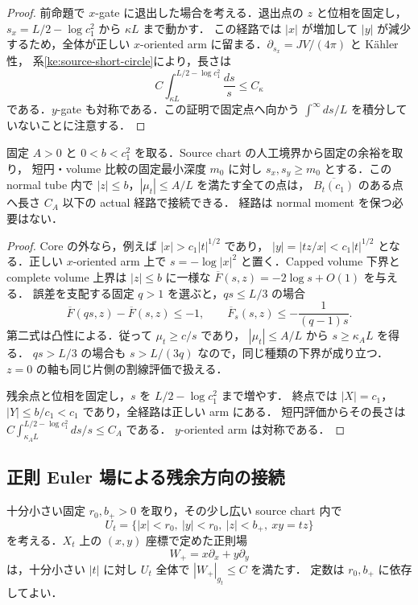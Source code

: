 \begin{proof}
前命題で $x$-gate に退出した場合を考える．退出点の $z$ と位相を固定し，
$s_x=L/2-\log c_1^2$ から $\kappa L$ まで動かす．
この経路では $|x|$ が増加して $|y|$ が減少するため，全体が正しい
$x$-oriented arm に留まる．$\partial_{s_x}=JV/(4\pi)$ と K\"ahler 性，
系\ref{ke:source-short-circle}により，長さは
\[
 C\int_{\kappa L}^{L/2-\log c_1^2}\frac{ds}{s}
 \le C_\kappa
\]
である．$y$-gate も対称である．この証明で固定点へ向かう
$\int^\infty ds/L$ を積分していないことに注意する．
\end{proof}

\begin{proposition}
\label{ke:source-central-band-reduction}
固定 $A>0$ と $0<b<c_1^2$ を取る．Source chart の人工境界から固定の余裕を取り，
短円・volume 比較の固定最小深度 $m_0$ に対し $s_x,s_y\ge m_0$ とする．この normal tube 内で
$|z|\le b$，$|\mu_t|\le A/L$ を満たす全ての点は，
$\overline{B_t(c_1)}$ のある点へ長さ $C_A$ 以下の actual 経路で接続できる．
経路は normal moment を保つ必要はない．
\end{proposition}

\begin{proof}
Core の外なら，例えば $|x|>c_1|t|^{1/2}$ であり，
$|y|=|tz/x|<c_1|t|^{1/2}$ となる．正しい $x$-oriented arm 上で
$s=-\log|x|^2$ と置く．Capped volume 下界と complete volume 上界は
$|z|\le b$ に一様な
$\overline F(s,z)=-2\log s+O(1)$ を与える．
誤差を支配する固定 $q>1$ を選ぶと，$qs\le L/3$ の場合
\[
 \overline F(qs,z)-\overline F(s,z)\le-1,
 \qquad
 \overline F_s(s,z)\le-\frac{1}{(q-1)s}.
\]
第二式は凸性による．従って $\mu_t\ge c/s$ であり，
$|\mu_t|\le A/L$ から $s\ge\kappa_A L$ を得る．
$qs>L/3$ の場合も $s>L/(3q)$ なので，同じ種類の下界が成り立つ．
$z=0$ の軸も同じ片側の割線評価で扱える．

残余点と位相を固定し，$s$ を $L/2-\log c_1^2$ まで増やす．
終点では $|X|=c_1$，$|Y|\le b/c_1<c_1$ であり，全経路は正しい arm にある．
短円評価からその長さは
$C\int_{\kappa_A L}^{L/2-\log c_1^2}ds/s\le C_A$ である．
$y$-oriented arm は対称である．
\end{proof}

\subsection{正則 Euler 場による残余方向の接続}

\begin{lemma}
\label{ke:source-euler-bound}
十分小さい固定 $r_0,b_+>0$ を取り，その少し広い source chart 内で
\[
 U_t=\{|x|<r_0,\ |y|<r_0,\ |z|<b_+,\ xy=tz\}
\]
を考える．$X_t$ 上の $(x,y)$ 座標で定めた正則場
\[
 W_+=x\partial_x+y\partial_y
\]
は，十分小さい $|t|$ に対し $U_t$ 全体で $|W_+|_{g_t}\le C$ を満たす．
定数は $r_0,b_+$ に依存してよい．
\end{lemma}

